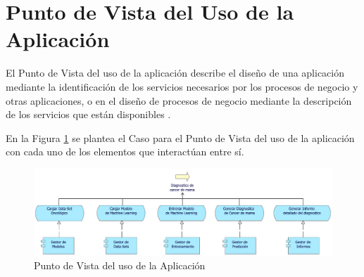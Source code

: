 \newpage
\section{Punto de Vista del Uso de la Aplicación}
El Punto de Vista del uso de la aplicación describe el diseño de una aplicación mediante la identificación de los servicios necesarios por los procesos de negocio y otras aplicaciones, o en el diseño de procesos de negocio mediante la descripción de los servicios que están disponibles \cite{BolanosCastro2019}.

En la Figura \ref{PvusoApp} se plantea el Caso para el Punto de Vista del uso de la aplicación con cada uno de los elementos que interactúan entre sí. 

\begin{figure}[h!]
	\centering
	\includegraphics[width=1\linewidth]{ARQUITECTURA/imgs/CapaAplicacion/4_PvUsoApp}
	\caption{Punto de Vista del uso de la Aplicación}
	\label{PvusoApp}
\end{figure}

